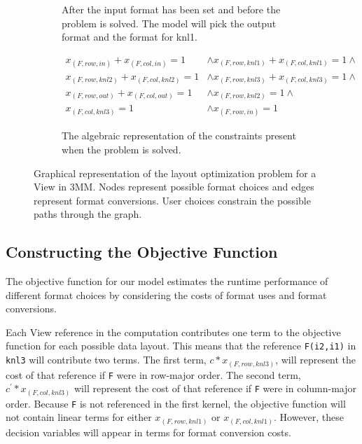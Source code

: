 \documentclass[sigconf,review=true]{acmart}
\begin{document}
\begin{figure}
\begin{subfigure}[t]{0.2\textwidth}
		\caption{After the input format has been set and before the problem is solved. The model will pick the output format and the format for knl1.}
		\label{graphModel:4}
	\end{subfigure}

	\vspace{5px}

	\begin{subfigure}{0.45\textwidth}
		\begin{align*}
			x_{(F,row,in)} + x_{(F,col,in)} = 1 &\wedge 
		x_{(F,row,knl1)} + x_{(F,col,knl1)} = 1 \wedge \\
		x_{(F,row,knl2)} + x_{(F,col,knl2)} = 1 &\wedge 
		x_{(F,row,knl3)} + x_{(F,col,knl3)} = 1 \wedge \\
		x_{(F,row,out)} + x_{(F,col,out)} = 1 &\wedge 
		x_{(F,row,knl2)} = 1 \wedge\\
		 x_{(F,col,knl3)} = 1 &\wedge x_{(F,row,in)} = 1
		\end{align*}
		
		\caption{The algebraic representation of the constraints present when the problem is solved.}
		\label{graphModel:5}
	\end{subfigure}

	\caption{Graphical representation of the layout optimization problem for a View in 3MM. Nodes represent possible format choices and edges represent format conversions. User choices constrain the possible paths through the graph.}
	\label{graphModel}
\end{figure}

\subsection{Constructing the Objective Function}

The objective function for our model estimates the runtime performance of different format choices by considering the costs of format uses and format conversions.

Each View reference in the computation contributes one term to the objective function for each possible data layout. This means that the reference \verb.F(i2,i1). in \verb.knl3. will contribute two terms.
The first term,  $c * x_{(F,row,knl3)}$, will represent the cost of that reference if \verb.F. were in row-major order. 
The second term, $c^\prime * x_{(F,col,knl3)}$ will represent the cost of that reference if \verb.F. were in column-major order.
Because \verb.F. is not referenced in the first kernel, the objective function will not contain linear terms for either $x_{(F,row,knl1)}$ or $x_{(F,col,knl1)}$.
However, these decision variables will appear in terms for format conversion costs.
\end{document}
